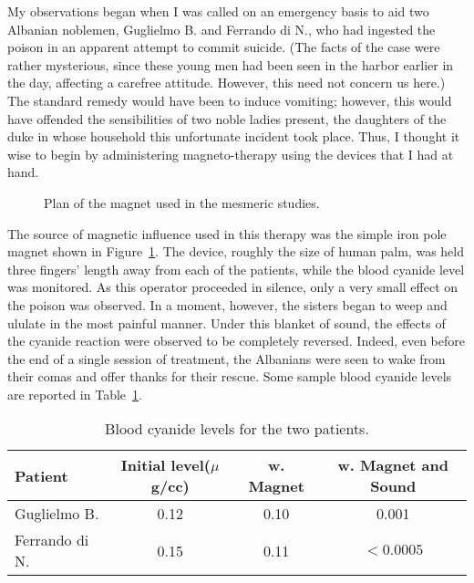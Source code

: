 \documentclass[12pt]{article}
\begin{document}
My observations began when I was called on an emergency basis to aid two
Albanian noblemen, Guglielmo B. and Ferrando di N., who had
ingested the poison in an apparent attempt to commit suicide.  (The facts
of the case were rather mysterious, since these young men had been seen in the 
harbor earlier in the day, affecting a carefree attitude.  However, this 
need not concern us here.)  The standard remedy would have been to induce
vomiting; however, this would have offended the 
sensibilities   of two 
noble ladies present, the daughters of the duke in whose household this 
unfortunate incident took place.  Thus, I thought it wise to begin by 
administering magneto-therapy using the devices that I had at hand.

\begin{figure}[htb]
\centering
\caption{Plan of the magnet used in the mesmeric studies.}
\label{fig:magnet}
\end{figure}

The source of magnetic influence used in this therapy was the simple
iron pole magnet shown in Figure~\ref{fig:magnet}.  The device, roughly
the size of human palm, was held three fingers' length away from each
of the patients, while the blood cyanide level was monitored.  As this 
operator proceeded in silence, only a very small effect on the poison was
observed.  In a moment, however, the sisters began to weep and ululate
in the most painful manner.  Under this blanket of sound, the effects of 
the cyanide reaction were observed to be completely reversed.  Indeed,
even before the end of a single session of treatment, the Albanians were
seen to wake from their comas and offer thanks for their rescue.  Some
sample blood cyanide levels are reported in Table~\ref{tab:blood}.



\begin{table}[t]
\begin{center}
\begin{tabular}{l|ccc}  
Patient &  Initial level($\mu$g/cc) &  w. Magnet &  
w. Magnet and Sound \\ \hline
 Guglielmo B.  &   0.12     &     0.10      &     0.001  \\
 Ferrando di N. &  0.15     &     0.11      &  $< 0.0005$ \\ \hline
\end{tabular}
\caption{Blood cyanide levels for the two patients.}
\label{tab:blood}
\end{center}
\end{table}
\end{document}
